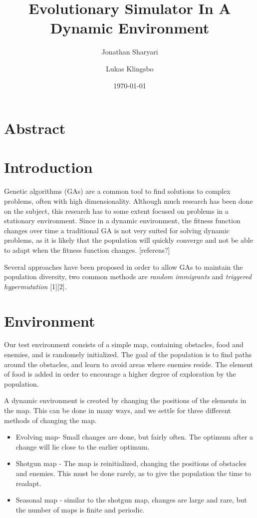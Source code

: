 \documentclass[a4paper,12pt]{article}
\title{\textbf{Evolutionary Simulator In A Dynamic Environment}}
\author{Jonathan Sharyari \and Lukas Klingsbo}  %
\date{\today}
\begin{document}
\maketitle


\section{Abstract}

\section{Introduction}
Genetic algorithms (GAs) are a common tool to find solutions to complex problems, often with high dimensionality. Although much research has been done on the subject, this research has to some extent focused on problems in a stationary environment. Since in a dynamic environment, the fitness function changes over time a traditional GA is not very suited for solving dynamic problems, as it is likely that the population will quickly converge and not be able to adapt when the fitness function changes. [referens?]

Several approaches have been proposed in order to allow GAs to maintain the population diversity, two common methods are \emph{random immigrants} and \emph{triggered hypermutation} [1][2].

\section{Environment}
Our test environment consists of a simple map, containing obstacles, food and enemies, and is randomely initialized. The goal of the population is to find paths around the obstacles, and learn to avoid areas where enemies reside. The element of food is added in order to encourage a higher degree of exploration by the population.

A dynamic environment is created by changing the positions of the elements in the map. This can be done in many ways, and we settle for three different methods of changing the map.

\begin{itemize}

\item
Evolving map- Small changes are done, but fairly often. The optimum after a change will lie close to the earlier optimum.
\item
Shotgun map - The map is reinitialized, changing the positions of obstacles and enemies. This must be done rarely, as to give the population the time to readapt.
\item
Seasonal map - similar to the shotgun map, changes are large and rare, but the number of maps is finite and periodic.
\end{itemize}
\end{document}
